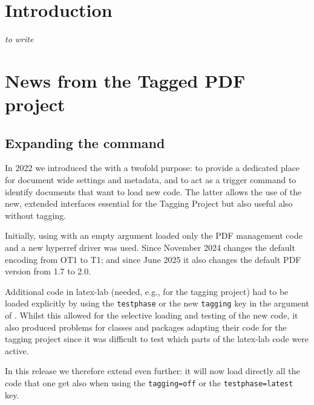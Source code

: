 \documentclass{ltnews}
\begin{document}
\maketitle
{  \spaceskip=3.33pt 
\tableofcontents}

\setlength{}

\medskip

\section{Introduction}

\emph{to write}


\section{News from the Tagged PDF project}

\subsection{Expanding the  command}
 
In 2022 we introduced the  with a twofold purpose:
to provide a dedicated place for document wide settings and metadata, 
and to act as a trigger command to identify documents that want to load new code.
The latter allows the use of the new, extended interfaces essential for the Tagging Project 
but also useful also without tagging.
 
Initially, using  with an empty argument loaded only the 
PDF management code and a new hyperref driver was used. 
Since November 2024  changes the default encoding from OT1 to
 T1; and since June 2025 it also changes the default PDF version from 1.7 to 2.0.

Additional code in latex-lab (needed, e.g., for the tagging project) had to be loaded 
explicitly by using the \texttt{testphase} or the new \texttt{tagging} key in 
the argument of . Whilst this allowed for the selective loading and 
testing of the new code, it also produced problems for classes and packages adapting 
their code for the tagging project
since it was difficult to test which parts of the latex-lab code were active.
 
In this release we therefore extend  even further: it 
will now load directly all the code that one get also when using the \texttt{tagging=off} or 
the \texttt{testphase=latest} key.  
\end{document}

